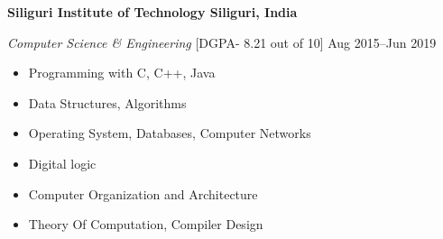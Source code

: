 \textbf{Siliguri Institute of Technology \hfill Siliguri, India} \par
\textit{Computer Science \& Engineering} [DGPA- 8.21 out of 10] \hfill Aug 2015--Jun 2019\par
{} \par
\doublecoulumnlist
    {
        \begin{itemize}
            \item Programming with C, C++, Java
            \item Data Structures, Algorithms
            \item Operating System, Databases, Computer Networks
        \end{itemize}
    }
    {
        \begin{itemize}
            \item Digital logic
            \item Computer Organization and Architecture
            \item Theory Of Computation, Compiler Design
        \end{itemize}
    }